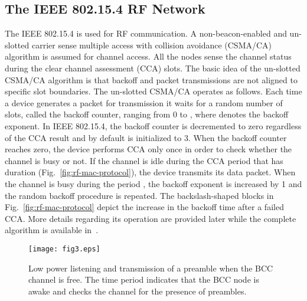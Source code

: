 \documentclass[10pt]{IEEEtran}
\newcounter{section:outage-analysis}
\begin{document}
\subsection{The IEEE 802.15.4 RF Network}
The IEEE 802.15.4 is used for RF communication. A non-beacon-enabled and un-slotted carrier sense multiple access with collision avoidance (CSMA/CA) algorithm is assumed for channel access. All the nodes sense the channel status during the clear channel assessment (CCA) slots. The basic idea of the un-slotted CSMA/CA algorithm is that backoff and packet transmissions are not aligned to specific slot boundaries. The un-slotted CSMA/CA operates as follows. Each time a device generates a packet for transmission it waits for a random number of slots, called the backoff counter, ranging from 0 to , where  denotes the backoff exponent. In IEEE 802.15.4, the backoff counter is decremented to zero regardless of the CCA result and by default  is initialized to 3. When the backoff counter reaches zero, the device performs CCA only once in order to check whether the channel is busy or not. If the channel is idle during the CCA period that has duration  (Fig.~\ref{fig:rf-mac-protocol}), the device transmits its data packet. When the channel is busy during the period , the backoff exponent  is increased by 1 and the random backoff procedure is repeated. The backslash-shaped blocks in Fig.~\ref{fig:rf-mac-protocol} depict the increase in the backoff time after a failed CCA. More details regarding its operation are provided later while the complete algorithm is available in~\cite{IEEE-802154}.




\begin{figure}[t]
\begin{center}
\texttt{[image: fig3.eps]}
  \caption{Low power listening and transmission of a preamble when the BCC channel is free. The time period  indicates that the BCC node is awake and checks the channel for the presence of preambles.}
  \label{fig:bcc-mac-protocol2}
\end{center}
\end{figure}
\end{document}
